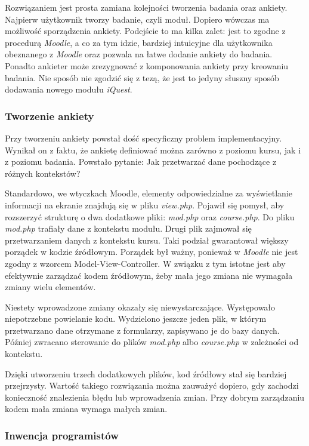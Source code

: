 \documentclass[12pt]{report}
\begin{document}
Rozwiązaniem jest prosta zamiana kolejności tworzenia badania oraz ankiety. Najpierw użytkownik tworzy badanie, czyli moduł. Dopiero wówczas ma możliwość sporządzenia ankiety. Podejście to ma kilka zalet: jest to zgodne z procedurą \emph{Moodle}, a co za tym idzie, bardziej intuicyjne dla użytkownika obeznanego z \emph{Moodle} oraz pozwala na łatwe dodanie ankiety do badania. Ponadto ankieter może zrezygnować z komponowania ankiety przy kreowaniu badania. Nie sposób nie zgodzić się z tezą, że jest to jedyny słuszny sposób dodawania nowego modułu \emph{iQuest}.

\subsubsection{Tworzenie ankiety}
Przy tworzeniu ankiety powstał dość specyficzny problem implementacyjny. Wynikał on z faktu, że ankietę definiować można zarówno z poziomu kursu, jak i z poziomu badania. Powstało pytanie: Jak przetwarzać dane pochodzące z różnych kontekstów? 

Standardowo, we wtyczkach Moodle, elementy odpowiedzialne za wyświetlanie informacji na ekranie znajdują się w pliku \emph{view.php}. Pojawił się pomysł, aby rozszerzyć strukturę o dwa dodatkowe pliki: \emph{mod.php} oraz \emph{course.php}. Do pliku \emph{mod.php} trafiały dane z kontekstu modułu. Drugi plik zajmował się przetwarzaniem danych z kontekstu kursu. Taki podział gwarantował większy porządek w kodzie źródłowym. Porządek był ważny, ponieważ w \emph{Moodle} nie jest zgodny z wzorcem Model-View-Controller. W związku z tym istotne jest aby efektywnie zarządzać kodem źródłowym, żeby mała jego zmiana nie wymagała zmiany wielu elementów.

Niestety wprowadzone zmiany okazały się niewystarczające. Występowało niepotrzebne powielanie kodu. Wydzielono jeszcze jeden plik, w którym przetwarzano dane otrzymane z formularzy, zapisywano je do bazy danych. Później zwracano sterowanie do plików \emph{mod.php} albo \emph{course.php} w zależności od kontekstu.

Dzięki utworzeniu trzech dodatkowych plików, kod źródłowy stał się bardziej przejrzysty. Wartość takiego rozwiązania można zauważyć dopiero, gdy zachodzi konieczność znalezienia błędu lub wprowadzenia zmian. Przy dobrym zarządzaniu kodem mała zmiana wymaga małych zmian.

\subsubsection{Inwencja programistów}
\end{document}
